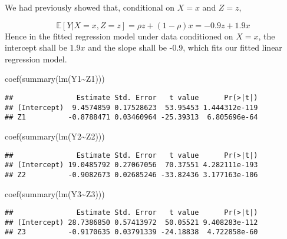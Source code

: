 \documentclass[
]{book}
\newenvironment{Shaded}{\begin{snugshade}}{\end{snugshade}}
\newcommand{\FunctionTok}[1]{\textcolor[rgb]{0.00,0.00,0.00}{#1}}
\newcommand{\NormalTok}[1]{#1}
\newcommand{\SpecialCharTok}[1]{\textcolor[rgb]{0.00,0.00,0.00}{#1}}
\begin{document}
We had previously showed that, conditional on \(X=x\) and \(Z=z\),

\[ \mathbb{E}[Y|X=x, Z=z] = \rho z + (1-\rho)x = -0.9z + 1.9x\] Hence in the fitted regression model under data conditioned on \(X=x\), the intercept shall be \(1.9x\) and the slope shall be -0.9, which fits our fitted linear regression model.

\begin{Shaded}
\begin{Highlighting}[]
\FunctionTok{coef}\NormalTok{(}\FunctionTok{summary}\NormalTok{(}\FunctionTok{lm}\NormalTok{(Y1}\SpecialCharTok{\textasciitilde{}}\NormalTok{Z1)))}
\end{Highlighting}
\end{Shaded}

\begin{verbatim}
##               Estimate Std. Error   t value      Pr(>|t|)
## (Intercept)  9.4574859 0.17528623  53.95453 1.444312e-119
## Z1          -0.8788471 0.03460964 -25.39313  6.805696e-64
\end{verbatim}

\begin{Shaded}
\begin{Highlighting}[]
\FunctionTok{coef}\NormalTok{(}\FunctionTok{summary}\NormalTok{(}\FunctionTok{lm}\NormalTok{(Y2}\SpecialCharTok{\textasciitilde{}}\NormalTok{Z2)))}
\end{Highlighting}
\end{Shaded}

\begin{verbatim}
##               Estimate Std. Error   t value      Pr(>|t|)
## (Intercept) 19.0485792 0.27067056  70.37551 4.282111e-193
## Z2          -0.9082673 0.02685246 -33.82436 3.177163e-106
\end{verbatim}

\begin{Shaded}
\begin{Highlighting}[]
\FunctionTok{coef}\NormalTok{(}\FunctionTok{summary}\NormalTok{(}\FunctionTok{lm}\NormalTok{(Y3}\SpecialCharTok{\textasciitilde{}}\NormalTok{Z3)))}
\end{Highlighting}
\end{Shaded}

\begin{verbatim}
##               Estimate Std. Error   t value      Pr(>|t|)
## (Intercept) 28.7386850 0.57413972  50.05521 9.408283e-112
## Z3          -0.9170635 0.03791339 -24.18838  4.722858e-60
\end{verbatim}
\end{document}
